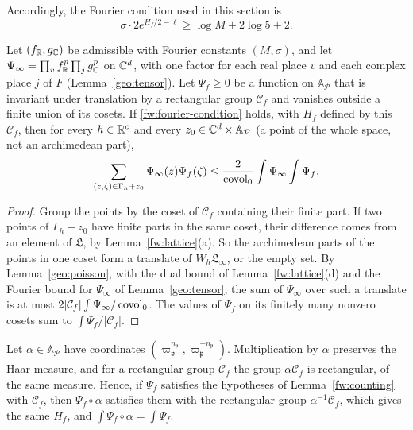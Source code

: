 Accordingly, the Fourier condition used in this section is
\begin{equation}\label{fw:fourier-condition}
 \sigma\cdot2e^{H_f/2-\ell}\ge\log M+2\log5+2 .
\end{equation}

\begin{lemma}\label{fw:counting}
Let $(f_\mathbb R,g_\mathbb C)$ be admissible with Fourier constants $(M,\sigma)$, and
let $\Psi_\infty=\prod_vf_\mathbb R^p\prod_jg_\mathbb C^p$ on $\mathbb C^d$, with one factor
for each real place $v$ and each complex place $j$ of $F$
(Lemma~\ref{geo:tensor}). Let $\Psi_f\ge0$ be a function on $\mathbb
A_{\mathcal P}$ that is invariant under translation by a rectangular
group $\mathcal C_f$ and vanishes outside a finite union of its cosets.
If \eqref{fw:fourier-condition} holds, with $H_f$ defined by this
$\mathcal C_f$, then for every $h\in\mathbb R^c$ and every
$z_0\in\mathbb C^d\times\mathbb A_{\mathcal P}$ (a point of the whole space,
not an archimedean part),
\begin{equation}\label{fw:weighted-count}
 \sum_{(z,\zeta)\in\Gamma_h+z_0}\Psi_\infty(z)\Psi_f(\zeta)
 \le\frac2{\operatorname{covol}_0}\int\Psi_\infty\int\Psi_f .
\end{equation}
\end{lemma}

\begin{proof}
Group the points by the coset of $\mathcal C_f$ containing their finite
part. If two points of $\Gamma_h+z_0$ have finite parts in the same
coset, their difference comes from an element of $\mathfrak L$, by
Lemma~\ref{fw:lattice}(a). So the archimedean parts of the points in one
coset form a translate of $W_h\mathfrak L_\infty$, or the empty set. By
Lemma~\ref{geo:poisson}, with the dual bound of
Lemma~\ref{fw:lattice}(d) and the Fourier bound for $\Psi_\infty$ of
Lemma~\ref{geo:tensor}, the sum of $\Psi_\infty$ over such a translate
is at most $2|\mathcal C_f|\int\Psi_\infty/\operatorname{covol}_0$. The values of
$\Psi_f$ on its finitely many nonzero cosets sum to
$\int\Psi_f/|\mathcal C_f|$.
\end{proof}

\begin{remark}\label{fw:rescaling}
Let $\alpha\in\mathbb A_{\mathcal P}$ have coordinates
$(\varpi_{\mathfrak p}^{n_{\mathfrak p}},\varpi_{\mathfrak
p}^{-n_{\mathfrak p}})$. Multiplication by $\alpha$ preserves the Haar
measure, and for a rectangular group $\mathcal C_f$ the group
$\alpha\mathcal C_f$ is rectangular, of the same measure. Hence, if
$\Psi_f$ satisfies the hypotheses of Lemma~\ref{fw:counting} with
$\mathcal C_f$, then $\Psi_f\circ\alpha$ satisfies them with the
rectangular group $\alpha^{-1}\mathcal C_f$, which gives the same $H_f$,
and $\int\Psi_f\circ\alpha=\int\Psi_f$.
\end{remark}

